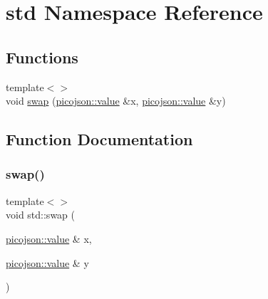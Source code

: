 \hypertarget{namespacestd}{}\section{std Namespace Reference}
\label{namespacestd}
\subsection*{Functions}
\begin{DoxyCompactItemize}
\item 
{\footnotesize template$<$$>$ }\\void \hyperlink{namespacestd_abb7e41c7063536ff6eeee4bb5f66de6c}{swap} (\hyperlink{classpicojson_1_1value}{picojson\+::value} \&x, \hyperlink{classpicojson_1_1value}{picojson\+::value} \&y)
\end{DoxyCompactItemize}


\subsection{Function Documentation}
\hypertarget{namespacestd_abb7e41c7063536ff6eeee4bb5f66de6c}{}\label{namespacestd_abb7e41c7063536ff6eeee4bb5f66de6c} 
\subsubsection{\texorpdfstring{swap()}{swap()}}
{\footnotesize\ttfamily template$<$$>$ \\
void std\+::swap (\begin{DoxyParamCaption}\item[{\hyperlink{classpicojson_1_1value}{picojson\+::value} \&}]{x,  }\item[{\hyperlink{classpicojson_1_1value}{picojson\+::value} \&}]{y }\end{DoxyParamCaption})\hspace{0.3cm}{\ttfamily [inline]}}

